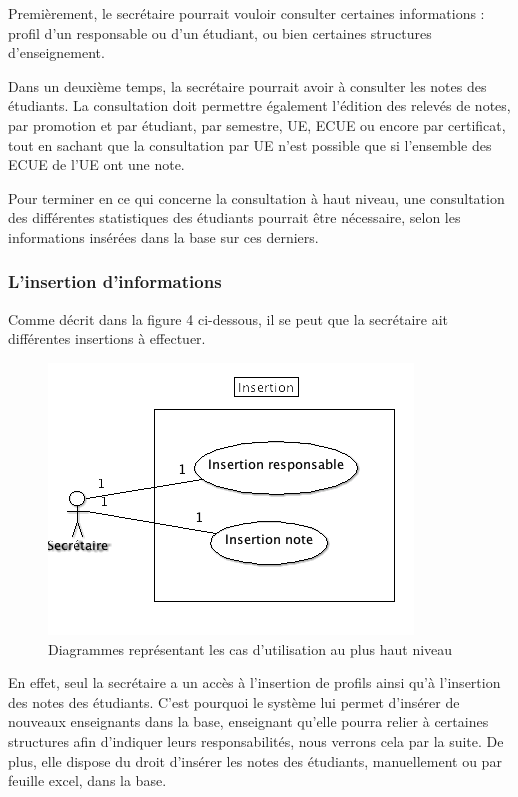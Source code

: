 \documentclass[letter, 11pt] {article}
\begin{document}
	Premièrement, le secrétaire pourrait vouloir consulter certaines informations : profil d'un responsable ou d'un étudiant, ou bien certaines structures d'enseignement.
	
	Dans un deuxième temps, la secrétaire pourrait avoir à consulter les notes des étudiants. 
La consultation doit permettre également l'édition des relevés de notes, par promotion et par étudiant, par semestre, UE, ECUE ou encore par certificat, tout en sachant que la consultation par UE n'est possible que si l'ensemble des ECUE de l'UE ont une note.
	
	Pour terminer en ce qui concerne la consultation à haut niveau, une consultation des différentes statistiques des étudiants pourrait être nécessaire, selon les informations insérées dans la base sur ces derniers.
	
	\subsubsection{L'insertion d'informations}
	
	Comme décrit dans la figure 4 ci-dessous, il se peut que la secrétaire ait différentes insertions à effectuer.
	
	\begin{figure}[!h]
		\centering
			\includegraphics[scale = 0.5]{../UseCase/UseCaseHautNiveau/Insertion.png}
		\caption{Diagrammes représentant les cas d'utilisation au plus haut niveau}
	\end{figure}
	\newpage
En effet, seul la  secrétaire a un accès à l'insertion de profils ainsi qu'à l'insertion des
notes des étudiants. C'est pourquoi le système lui permet d'insérer de nouveaux enseignants
dans la base, enseignant qu'elle pourra relier à certaines structures afin d'indiquer
leurs responsabilités, nous verrons cela par la suite. De plus, elle dispose du droit d'insérer
les notes des étudiants, manuellement ou par feuille excel, dans la base.
	
\end{document}
